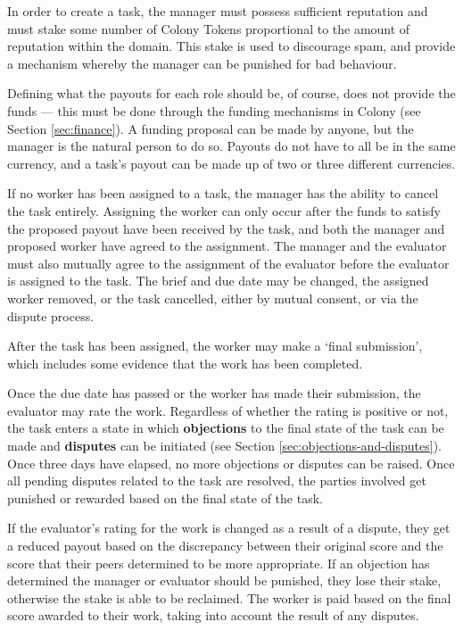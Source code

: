In order to create a task, the manager must possess sufficient reputation and must stake some number of Colony Tokens proportional to the amount of reputation within the domain. This stake is used to discourage spam, and provide a mechanism whereby the manager can be punished for bad behaviour. 

Defining what the payouts for each role should be, of course, does not provide the funds --- this must be done through the funding mechanisms in Colony (see Section \ref{sec:finance}). A funding proposal can be made by anyone, but the manager is the natural person to do so. Payouts do not have to all be in the same currency, and a task's payout can be made up of two or three different currencies.

If no worker has been assigned to a task, the manager has the ability to cancel the task entirely. Assigning the worker can only occur after the funds to satisfy the proposed payout have been received by the task, and both the manager and proposed worker have agreed to the assignment. The manager and the evaluator must also mutually agree to the assignment of the evaluator before the evaluator is assigned to the task. The brief and due date may be changed, the assigned worker removed, or the task cancelled, either by mutual consent, or via the dispute process.

After the task has been assigned, the worker may make a `final submission', which includes some evidence that the work has been completed.

Once the due date has passed or the worker has made their submission, the evaluator may rate the work. Regardless of whether the rating is positive or not, the task enters a state in which \textbf{objections} to the final state of the task can be made and \textbf{disputes} can be initiated (see Section \ref{sec:objections-and-disputes}). Once three days have elapsed, no more objections or disputes can be raised. Once all pending disputes related to the task are resolved, the parties involved get punished or rewarded based on the final state of the task.

If the evaluator's rating for the work is changed as a result of a dispute, they get a reduced payout based on the discrepancy between their original score and the score that their peers determined to be more appropriate. If an objection has determined the manager or evaluator should be punished, they lose their stake, otherwise the stake is able to be reclaimed. The worker is paid based on the final score awarded to their work, taking into account the result of any disputes.

